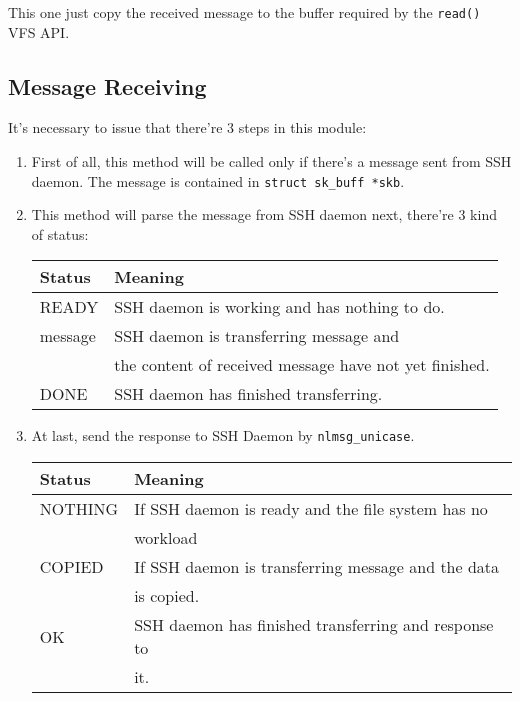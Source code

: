 This one just copy the received message to the buffer required by the \lstinline{read()} VFS API.

\subsection{Message Receiving}

It's necessary to issue that there're 3 steps in this module:
\begin{enumerate}
\item First of all, this method will be called only if there's a message sent from SSH daemon. The message is contained in \lstinline{struct sk_buff *skb}.
\item This method will parse the message from SSH daemon next, there're 3 kind of status:
	\begin{center}
	\begin{tabular}{|l|l|}
	\hline
	Status	& Meaning\\
	\hline
	READY 		& SSH daemon is working and has nothing to do.\\
	message		& SSH daemon is transferring message and \\
				& the content of received message have not yet finished.\\
	DONE 		& SSH daemon has finished transferring.\\
	\hline
	\end{tabular}
	\end{center}
\item At last, send the response to SSH Daemon by \lstinline{nlmsg_unicase}.
	\begin{center}
	\begin{tabular}{|l|l|}
	\hline
	Status	& Meaning\\
	\hline
	NOTHING 		& If SSH daemon is ready and the file system has no \\
				& workload\\
	COPIED		& If SSH daemon is transferring message and the data \\
				& is copied.\\ 
	OK 			& SSH daemon has finished transferring and response to \\
				& it.\\
	\hline
	\end{tabular}
	\end{center}
\end{enumerate}

